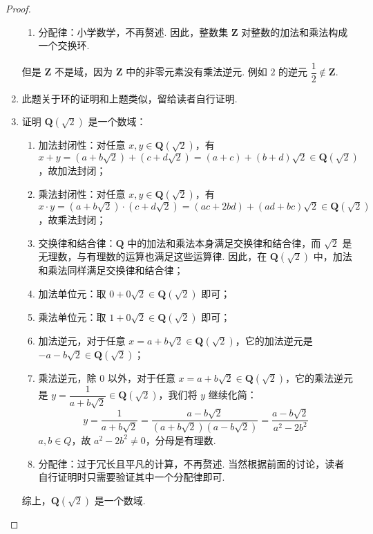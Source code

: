 \begin{proof}
\begin{enumerate}
\begin{enumerate}
        \item 分配律：小学数学，不再赘述.
        因此，整数集 $\mathbf{Z}$ 对整数的加法和乘法构成一个交换环.
    \end{enumerate}
    但是 $\mathbf{Z}$ 不是域，因为 $\mathbf{Z}$ 中的非零元素没有乘法逆元. 例如 $2$ 的逆元 $\dfrac{1}{2} \notin \mathbf{Z}$.
    \item 此题关于环的证明和上题类似，留给读者自行证明.
    \item 证明 $\mathbf{Q}(\sqrt{2})$ 是一个数域：
    \begin{enumerate}
        \item 加法封闭性：对任意 $x, y \in \mathbf{Q}(\sqrt{2})$，有$x + y = (a + b\sqrt{2}) + (c + d\sqrt{2}) = (a + c) + (b + d)\sqrt{2} \in \mathbf{Q}(\sqrt{2})$，故加法封闭；
        \item 乘法封闭性：对任意 $x, y \in \mathbf{Q}(\sqrt{2})$，有$x \cdot y = (a + b\sqrt{2}) \cdot (c + d\sqrt{2}) = (ac + 2bd) + (ad + bc)\sqrt{2} \in \mathbf{Q}(\sqrt{2})$，故乘法封闭；
        \item 交换律和结合律：$\mathbf{Q}$ 中的加法和乘法本身满足交换律和结合律，而 $\sqrt{2}$ 是无理数，与有理数的运算也满足这些运算律. 因此，在 $\mathbf{Q}(\sqrt{2})$ 中，加法和乘法同样满足交换律和结合律；
        \item 加法单位元：取 $0 + 0\sqrt{2} \in \mathbf{Q}(\sqrt{2})$ 即可；
        \item 乘法单位元：取 $1 + 0\sqrt{2} \in \mathbf{Q}(\sqrt{2})$ 即可；
        \item 加法逆元，对于任意 $x = a + b\sqrt{2} \in \mathbf{Q}(\sqrt{2})$，它的加法逆元是 $-a - b\sqrt{2} \in \mathbf{Q}(\sqrt{2})$；
        \item 乘法逆元，除 $0$ 以外，对于任意 $x = a + b\sqrt{2} \in \mathbf{Q}(\sqrt{2})$，它的乘法逆元是 $y = \dfrac{1}{a + b\sqrt{2}} \in \mathbf{Q}(\sqrt{2})$，我们将 $y$ 继续化简：
        \[ y = \frac{1}{a + b\sqrt{2}} = \frac{a - b\sqrt{2}}{(a + b\sqrt{2})(a - b\sqrt{2})} = \frac{a - b\sqrt{2}}{a^2 - 2b^2}\]
        $a,b \in Q$，故 $a^2 - 2b^2 \neq 0$，分母是有理数.
        \item 分配律：过于冗长且平凡的计算，不再赘述. 当然根据前面的讨论，读者自行证明时只需要验证其中一个分配律即可.
    \end{enumerate}
    综上，$\mathbf{Q}(\sqrt{2})$ 是一个数域.
\end{enumerate}
\end{proof}

